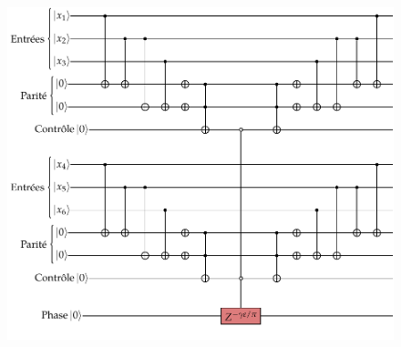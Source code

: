 \begin{figure}[h]
    \centering
    \includegraphics[width=1\textwidth]{figures/tower-excited-states-circuit.pdf}
    \caption[Circuit d'effondrement des états excités]{}
    \label{fig:tower-excited-states-circuit}
\end{figure}

